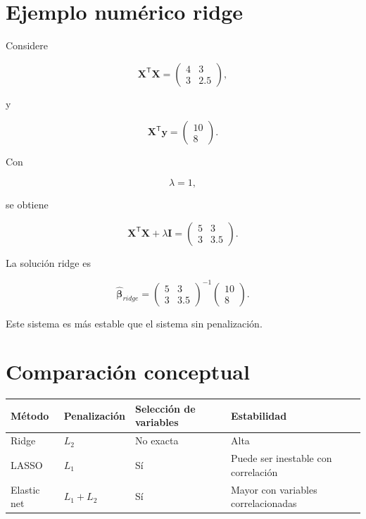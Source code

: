 \documentclass[
  spanish,
  10.5pt,
  letterpaper,
  DIV=11,
  numbers=noendperiod,
  oneside,
  open=any]{scrreprt}
\newcounter{none} %
\theoremstyle{definition}
\theoremstyle{definition}
\theoremstyle{plain}
\theoremstyle{remark}
\begin{document}
\section*{Ejemplo numérico ridge}\label{ejemplo-numuxe9rico-ridge}


Considere

\[
\mathbf{X}^{\mathsf T}\mathbf{X}
=
\begin{pmatrix}
4 & 3\\
3 & 2.5
\end{pmatrix},
\]

y

\[
\mathbf{X}^{\mathsf T}\mathbf{y}
=
\begin{pmatrix}
10\\
8
\end{pmatrix}.
\]

Con

\[
\lambda=1,
\]

se obtiene

\[
\mathbf{X}^{\mathsf T}\mathbf{X}
+
\lambda\mathbf{I}
=
\begin{pmatrix}
5 & 3\\
3 & 3.5
\end{pmatrix}.
\]

La solución ridge es

\[
\widehat{\boldsymbol{\beta}}_{ridge}
=
\begin{pmatrix}
5 & 3\\
3 & 3.5
\end{pmatrix}^{-1}
\begin{pmatrix}
10\\
8
\end{pmatrix}.
\]

Este sistema es más estable que el sistema sin penalización.

\section*{Comparación conceptual}\label{comparaciuxf3n-conceptual}


{\def\LTcaptype{none} %
\begin{longtable}[]{@{}llll@{}}
\toprule\noalign{}
Método & Penalización & Selección de variables & Estabilidad \\
\midrule\noalign{}
\endhead
\bottomrule\noalign{}
\endlastfoot
Ridge & \(L_2\) & No exacta & Alta \\
LASSO & \(L_1\) & Sí & Puede ser inestable con correlación \\
Elastic net & \(L_1+L_2\) & Sí & Mayor con variables correlacionadas \\
\end{longtable}
}
\end{document}
